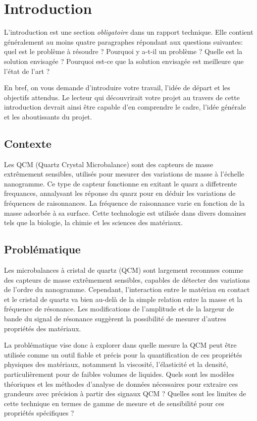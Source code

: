 \chapter{Introduction}

L'introduction est une section \emph{obligatoire} dans un rapport technique. Elle contient généralement au moins quatre paragraphes répondant aux questions suivantes: quel est le problème à résoudre ? Pourquoi y a-t-il un problème ? Quelle est la solution envisagée ? Pourquoi est-ce que la solution envisagée est meilleure que l'état de l'art ?

En bref, on vous demande d'introduire votre travail, l'idée de départ et les objectifs attendus. Le lecteur qui découvrirait votre projet au travers de cette introduction devrait ainsi être capable d'en comprendre le cadre, l'idée générale et les aboutissants du projet.

\section{Contexte}

Les QCM (Quartz Crystal Microbalance) sont des capteurs de masse extrêmement sensibles, 
utilisés pour mesurer des variations de masse à l'échelle nanogramme. 
Ce type de capteur fonctionne en exitant le quarz a diffetrente frequances, 
annalysant les réponse du quarz pour en déduir les variations de fréquences de raisonnances.
La fréquence de raisonnance varie en fonction de la masse adsorbée à sa surface. 
Cette technologie est utilisée dans divers domaines tels que la biologie, 
la chimie et les sciences des matériaux.

\section{Problématique}
Les microbalances à cristal de quartz (QCM) sont largement reconnues comme des capteurs de masse extrêmement sensibles, capables de détecter des variations de l'ordre du nanogramme. Cependant, l'interaction entre le matériau en contact et le cristal de quartz va bien au-delà de la simple relation entre la masse et la fréquence de résonance. Les modifications de l'amplitude et de la largeur de bande du signal de résonance suggèrent la possibilité de mesurer d'autres propriétés des matériaux.

La problématique vise donc à explorer dans quelle mesure la QCM peut être utilisée comme un outil fiable et précis pour la quantification de ces propriétés physiques des matériaux, notamment la viscosité, l'élasticité et la densité, particulièrement pour de faibles volumes de liquides. Quels sont les modèles théoriques et les méthodes d'analyse de données nécessaires pour extraire ces grandeurs avec précision à partir des signaux QCM ? Quelles sont les limites de cette technique en termes de gamme de mesure et de sensibilité pour ces propriétés spécifiques ?

